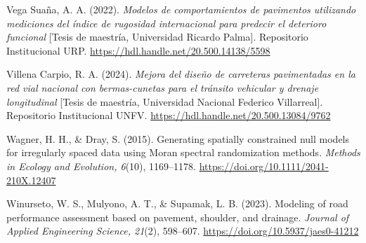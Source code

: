 \begin{list}{}
\item Vega Suaña, A. A. (2022). \textit{Modelos de comportamientos de pavimentos utilizando mediciones del índice de rugosidad internacional para predecir el deterioro funcional} [Tesis de maestría, Universidad Ricardo Palma]. Repositorio Institucional URP. \url{https://hdl.handle.net/20.500.14138/5598}
\item Villena Carpio, R. A. (2024). \textit{Mejora del diseño de carreteras pavimentadas en la red vial nacional con bermas-cunetas para el tránsito vehicular y drenaje longitudinal} [Tesis de maestría, Universidad Nacional Federico Villarreal]. Repositorio Institucional UNFV. \url{https://hdl.handle.net/20.500.13084/9762}
\item Wagner, H. H., \& Dray, S. (2015). Generating spatially constrained null models for irregularly spaced data using Moran spectral randomization methods. \textit{Methods in Ecology and Evolution, 6}(10), 1169–1178. \url{https://doi.org/10.1111/2041-210X.12407}
\item Winurseto, W. S., Mulyono, A. T., \& Supamak, L. B. (2023). Modeling of road performance assessment based on pavement, shoulder, and drainage. \textit{Journal of Applied Engineering Science, 21}(2), 598–607. \url{https://doi.org/10.5937/jaes0-41212}
\end{list}
